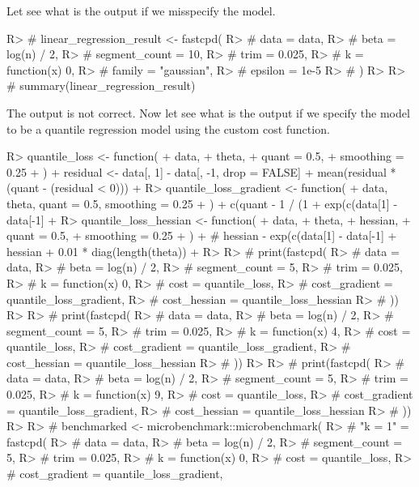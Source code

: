 \documentclass[article]{jss}
\begin{document}
Let see what is the output if we misspecify the model.
%
\begin{Schunk}
\begin{Sinput}
R> # linear_regression_result <- fastcpd(
R> #   data = data,
R> #   beta = log(n) / 2,
R> #   segment_count = 10,
R> #   trim = 0.025,
R> #   k = function(x) 0,
R> #   family = "gaussian",
R> #   epsilon = 1e-5
R> # )
R> 
R> # summary(linear_regression_result)
\end{Sinput}
\end{Schunk}
%
The output is not correct. Now let see what is the output if we specify the
model to be a quantile regression model using the custom cost function.
%
\begin{Schunk}
\begin{Sinput}
R> quantile_loss <- function(
+    data,
+    theta,
+    quant = 0.5,
+    smoothing = 0.25
+  ) {
+    residual <- data[, 1] - data[, -1, drop = FALSE] %*% theta
+    mean(residual * (quant - (residual < 0)))
+  }
R> quantile_loss_gradient <- function(
+    data, theta, quant = 0.5, smoothing = 0.25
+  ) {
+    c(quant - 1 / (1 + exp(c(data[1] - data[-1] %*% theta) / smoothing))) * data[-1]
+  }
R> quantile_loss_hessian <- function(
+    data,
+    theta,
+    hessian,
+    quant = 0.5,
+    smoothing = 0.25
+  ) {
+    # hessian - exp(c(data[1] - data[-1] %*% theta) / smoothing) / (smoothing * (1 + exp(c(data[1] - data[-1] %*% theta) / smoothing))^2) * data[-1] %o% data[-1]
+    hessian + 0.01 * diag(length(theta))
+  }
R> 
R> # print(fastcpd(
R> #   data = data,
R> #   beta = log(n) / 2,
R> #   segment_count = 5,
R> #   trim = 0.025,
R> #   k = function(x) 0,
R> #   cost = quantile_loss,
R> #   cost_gradient = quantile_loss_gradient,
R> #   cost_hessian = quantile_loss_hessian
R> # ))
R> 
R> # print(fastcpd(
R> #   data = data,
R> #   beta = log(n) / 2,
R> #   segment_count = 5,
R> #   trim = 0.025,
R> #   k = function(x) 4,
R> #   cost = quantile_loss,
R> #   cost_gradient = quantile_loss_gradient,
R> #   cost_hessian = quantile_loss_hessian
R> # ))
R> 
R> # print(fastcpd(
R> #   data = data,
R> #   beta = log(n) / 2,
R> #   segment_count = 5,
R> #   trim = 0.025,
R> #   k = function(x) 9,
R> #   cost = quantile_loss,
R> #   cost_gradient = quantile_loss_gradient,
R> #   cost_hessian = quantile_loss_hessian
R> # ))
R> 
R> # benchmarked <- microbenchmark::microbenchmark(
R> #   "k = 1" = fastcpd(
R> #     data = data,
R> #     beta = log(n) / 2,
R> #     segment_count = 5,
R> #     trim = 0.025,
R> #     k = function(x) 0,
R> #     cost = quantile_loss,
R> #     cost_gradient = quantile_loss_gradient,

\end{Sinput}
\end{Schunk}
\end{document}
